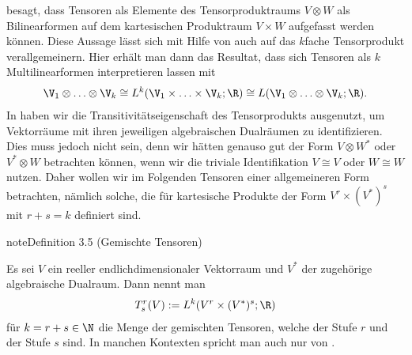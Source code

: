 \documentclass[letterpaper,10pt,english]{jupyterBook}
\begin{document}
\sphinxAtStartPar
{\hyperref[\detokenize{vektoranalysis/tensor:cor:tensorMultilinearform}]{}} besagt, dass Tensoren als Elemente des Tensorproduktraums \(V \otimes W\) als Bilinearformen auf dem kartesischen Produktraum \(V \times W\) aufgefasst werden können.
Diese Aussage lässt sich mit Hilfe von {\hyperref[\detokenize{vektoranalysis/tensor:rem:kfachesTensorprodukt}]{}} auch auf das \(k\)\sphinxhyphen{}fache Tensorprodukt verallgemeinern.
Hier erhält man dann das Resultat, dass sich Tensoren als \(k\)\sphinxhyphen{}Multilinearformen interpretieren lassen mit
\begin{equation*}
\begin{split}\V_1\otimes\ldots\otimes\V_k \cong L^k(\V_1\times\ldots\times\V_k;\R) \cong L(\V_1\otimes\ldots \otimes\V_k;\R).\end{split}
\end{equation*}
\sphinxAtStartPar
In {\hyperref[\detokenize{vektoranalysis/tensor:equation-eq-transitivisomorphismus}]{}} haben wir die Transitivitätseigenschaft des Tensorprodukts ausgenutzt, um  Vektorräume mit ihren jeweiligen algebraischen Dualräumen zu identifizieren.
Dies muss jedoch nicht sein, denn wir hätten genauso gut  der Form \(V \otimes W^\ast\) oder \(V^\ast \otimes W\) betrachten können, wenn wir die triviale Identifikation \(V \cong V\) oder \(W \cong W\) nutzen.
Daher wollen wir im Folgenden Tensoren einer allgemeineren Form betrachten, nämlich solche, die für kartesische Produkte der Form \(V^r\times (V^\ast)^s\) mit \(r+s=k\) definiert sind.
\label{vektoranalysis/tensor:def:gemischteTensoren}
\begin{sphinxadmonition}{note}{Definition 3.5 (Gemischte Tensoren)}



\sphinxAtStartPar
Es sei \(V\) ein reeller endlich\sphinxhyphen{}dimensionaler Vektorraum und \(V^\ast\) der zugehörige algebraische Dualraum.
Dann nennt man
\begin{equation*}
\begin{split}T^r_s(V) := L^k(V^r\times (V^\ast)^s; \R)\end{split}
\end{equation*}
\sphinxAtStartPar
für \(k = r+s \in \N\) die Menge der gemischten Tensoren, welche  der Stufe \(r\) und  der Stufe \(s\) sind.
In manchen Kontexten spricht man auch nur von .
\end{sphinxadmonition}
\end{document}
